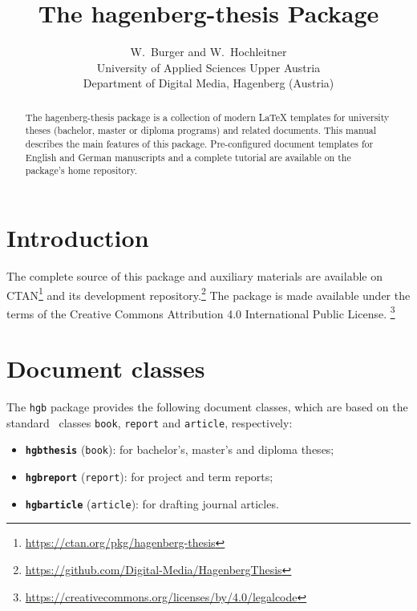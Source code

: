 \documentclass[english]{hgbarticle}
\title{The \textsf{hagenberg-thesis} Package}
\date{\hgbDate}
\author{W.\ Burger and W.\ Hochleitner\\[10pt]
University of Applied Sciences Upper Austria\\
Department of Digital Media, Hagenberg (Austria)}
\begin{document}
\maketitle

\begin{abstract}\noindent
The \textsf{hagenberg-thesis} package is a collection of modern LaTeX templates for university theses (bachelor, 
master or diploma programs) and related documents.
This manual describes the main features of this package.
Pre-configured document templates for English and German manuscripts and a complete
tutorial are available on the package's home repository.
\end{abstract}



\section{Introduction}

The complete source of this package and auxiliary materials are available on
CTAN\footnote{\url{https://ctan.org/pkg/hagenberg-thesis}}
and its development repository.\footnote{\url{https://github.com/Digital-Media/HagenbergThesis}}
The package is made available under the terms of the
Creative Commons Attribution 4.0 International Public License.%
\footnote{\url{https://creativecommons.org/licenses/by/4.0/legalcode}}


\section{Document classes}

The \texttt{hgb} package provides the following document classes,
which are based on the standard \latex\ classes
\texttt{book}, \texttt{report} and \texttt{article}, respectively:
%
\begin{itemize}
\item \textbf{\texttt{hgbthesis}} (\texttt{book}): 
for bachelor's, master's and diploma theses;
\item \textbf{\texttt{hgbreport}} (\texttt{report}):
for project and term reports;
\item \textbf{\texttt{hgbarticle}} (\texttt{article}):
for drafting journal articles.
\end{itemize}
\end{document}
